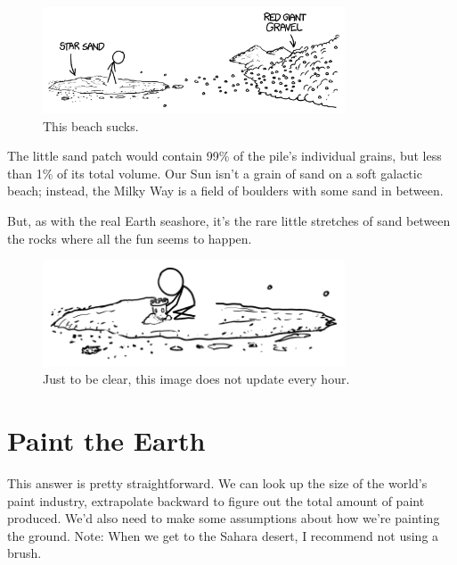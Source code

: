 {\begin{figure}[!htbp]
\centering
\includegraphics[scale=0.5, max width=0.8\textwidth]{imgs/a/83/sand_gravel.png}
\caption{This beach sucks.}
\end{figure}

{The little sand patch would contain 99\% of the pile's individual grains, but less than 1\% of its total volume. Our Sun isn't a grain of sand on a soft galactic beach; instead, the Milky Way is a field of boulders with some sand in between.}

{But, as with the real Earth seashore, it's the rare little stretches of sand between the rocks where all the fun seems to happen.}

\begin{figure}[!htbp]
\centering
\includegraphics[scale=0.5, max width=0.8\textwidth]{imgs/a/83/sand_castle.png}
\caption{Just to be clear, this image does not update every hour.}
\end{figure}

{
\chapter{Paint the Earth}
}

\hfill{}

{This answer is pretty straightforward. We can look up the size of the world's paint industry, extrapolate backward to figure out the total amount of paint produced. We'd also need to make some assumptions about how we're painting the ground. Note: When we get to the Sahara desert, I recommend not using a brush.}

}
